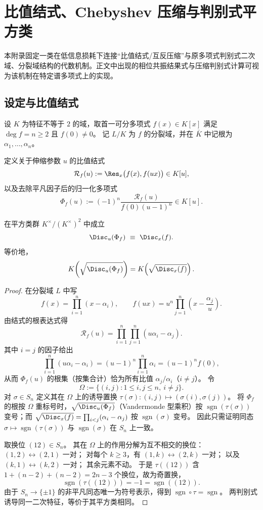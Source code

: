 \section{比值结式、Chebyshev 压缩与判别式平方类}\label{app:ratio-resultant-discriminant-rigidity}

本附录固定一类在低信息损耗下连接“比值结式/互反压缩”与原多项式判别式二次域、分裂域结构的代数机制。正文中出现的相位共振结果式与压缩判别式计算可视为该机制在特定谱多项式上的实现。

\subsection{设定与比值结式}
设 \(K\) 为特征不等于 \(2\) 的域，取首一可分多项式 \(f(x)\in K[x]\) 满足 \(\deg f=n\ge 2\) 且 \(f(0)\neq 0\)。
记 \(L/K\) 为 \(f\) 的分裂域，并在 \(\bar K\) 中记根为 \(\alpha_1,\dots,\alpha_n\)。

\begin{definition}[比值结式与归一化互反多项式]\label{def:ratio-resultant}
定义关于伸缩参数 \(u\) 的比值结式
\[
\mathcal R_f(u):=\Res_x\bigl(f(x),f(ux)\bigr)\in K[u],
\]
以及去除平凡因子后的归一化多项式
\[
\Phi_f(u):=(-1)^n\frac{\mathcal R_f(u)}{f(0)(u-1)^n}\in K[u].
\]
\end{definition}

\begin{theorem}[比值结式的二次判别式刚性]\label{thm:ratio-resultant-disc-rigidity}
在平方类群 \(K^{\times}/(K^{\times})^{2}\) 中成立
\[
\Disc_u(\Phi_f)\ \equiv\ \Disc_x(f).
\]
等价地，
\[
K\!\left(\sqrt{\Disc_u(\Phi_f)}\right)=K\!\left(\sqrt{\Disc_x(f)}\right).
\]
\end{theorem}
\begin{proof}
在分裂域 \(L\) 中写
\[
f(x)=\prod_{i=1}^n(x-\alpha_i),
\qquad
f(ux)=u^n\prod_{j=1}^n\left(x-\frac{\alpha_j}{u}\right).
\]
由结式的根表达式得
\[
\mathcal R_f(u)=\prod_{i=1}^n\prod_{j=1}^n (u\alpha_i-\alpha_j).
\]
其中 \(i=j\) 的因子给出
\[
\prod_{i=1}^n(u\alpha_i-\alpha_i)=(u-1)^n\prod_{i=1}^n\alpha_i=(u-1)^n f(0),
\]
从而 \(\Phi_f(u)\) 的根集（按集合计）恰为所有比值 \(\alpha_j/\alpha_i\)（\(i\neq j\)）。
令
\[
\Omega:=\{(i,j):1\le i,j\le n,\ i\neq j\}.
\]
对 \(\sigma\in S_n\) 定义其在 \(\Omega\) 上的诱导置换
\(
\tau(\sigma):(i,j)\mapsto(\sigma(i),\sigma(j))
\)。
将 \(\Phi_f\) 的根按 \(\Omega\) 重标号时，\(\sqrt{\Disc_u(\Phi_f)}\)（Vandermonde 型乘积）按 \(\operatorname{sgn}(\tau(\sigma))\) 变号；而
\(\sqrt{\Disc_x(f)}=\prod_{i<j}(\alpha_i-\alpha_j)\)
按 \(\operatorname{sgn}(\sigma)\) 变号。
因此只需证明同态 \(\sigma\mapsto \operatorname{sgn}(\tau(\sigma))\) 与 \(\operatorname{sgn}(\sigma)\) 在 \(S_n\) 上一致。

取换位 \((12)\in S_n\)。
其在 \(\Omega\) 上的作用分解为互不相交的换位：
\((1,2)\leftrightarrow(2,1)\) 一对；
对每个 \(k\ge 3\)，有 \((1,k)\leftrightarrow(2,k)\) 一对；
以及 \((k,1)\leftrightarrow(k,2)\) 一对；
其余元素不动。
于是 \(\tau((12))\) 含 \(1+(n-2)+(n-2)=2n-3\) 个换位，故为奇置换，
\[
 \operatorname{sgn}(\tau((12)))=-1=\operatorname{sgn}((12)).
\]
由于 \(S_n\to\{\pm1\}\) 的非平凡同态唯一为符号表示，得到 \(\operatorname{sgn}\circ\tau=\operatorname{sgn}\)。
两判别式诱导同一二次特征，等价于其平方类相同。
\end{proof}

